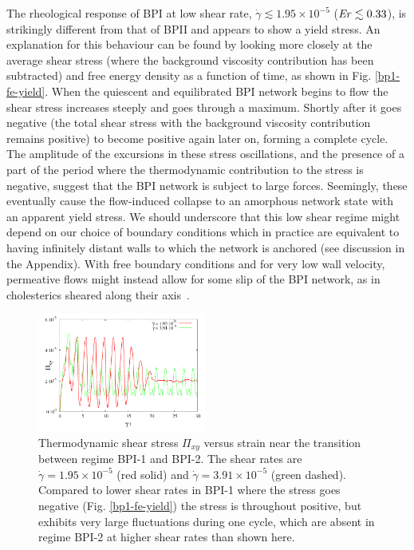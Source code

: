 \documentclass[8.5pt,twoside,twocolumn]{article}
\newcommand{\e}[1]{\times10^{#1}}
\newcommand{\gd}{\dot{\gamma}}
\begin{document}
The rheological response of BPI at low shear rate, $\gd\lesssim1.95\e{-5}$
(${\it Er} \lesssim 0.33$), 
is strikingly different from that of BPII and appears to show a
yield stress. An explanation for this behaviour can be found by 
looking more closely at the average shear stress (where the
background viscosity contribution has been subtracted) and 
free energy density as a function of time, as shown in Fig. \ref{bp1-fe-yield}.
When the quiescent and equilibrated BPI network begins to flow
the shear stress increases steeply and goes through a maximum.
Shortly after it goes negative (the total shear stress 
with the background viscosity contribution remains positive) 
to become positive again later on, forming a complete cycle.
The amplitude of the excursions in these stress oscillations, and
the presence of a part of the period where the thermodynamic
contribution to the stress is negative, suggest that the
BPI network is subject to large forces. Seemingly, these eventually
cause the flow-induced collapse to an amorphous network state with
an apparent yield stress. We should underscore that this
low shear regime might depend on our choice of boundary
conditions which in practice are equivalent to having infinitely
distant walls to which the network is anchored (see discussion
in the Appendix).
With free boundary conditions and for very low wall velocity, 
permeative flows might instead allow for
some slip of the BPI network, as in cholesterics sheared
along their axis~\cite{Marenduzzo:2006b}.

\begin{figure}[htpb]
\includegraphics[width=0.495\textwidth]{stress_bp1-1_bp1-2.pdf}
\caption{Thermodynamic shear stress $\Pi_{xy}$ versus strain near the transition between regime
BPI-1 and BPI-2. The shear rates are $\gd=1.95\e{-5}$ (red solid) 
and $\gd=3.91\e{-5}$ (green dashed). Compared to lower shear rates in BPI-1 
where the stress goes negative (Fig. \ref{bp1-fe-yield}) the stress is 
throughout positive, but exhibits very large fluctuations during one cycle, 
which are absent in regime BPI-2 at higher shear rates than shown here.}
\label{bp1-1_bp1-2}
\end{figure}
\end{document}
